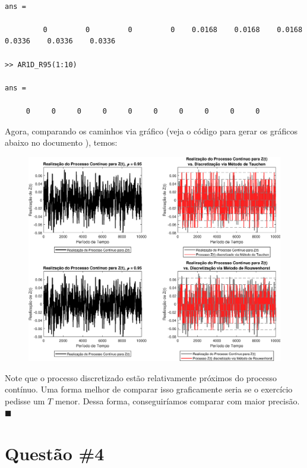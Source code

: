 \documentclass[10pt]{article}
\newcommand*{\QEDA}{\hfill\ensuremath{\blacksquare}}%
\newcommand\0{\mathbf{0}}
\newenvironment{sol}
    {\\[1em] {\color{magenta}\text{Resposta.}}
    }
    {{\color{blue!50!black}\QEDA}}
\begin{document}
\begin{sol}
\begin{lstlisting}
ans =

         0         0         0         0    0.0168    0.0168    0.0168    0.0336    0.0336    0.0336

>> AR1D_R95(1:10)

ans =

     0     0     0     0     0     0     0     0     0     0
\end{lstlisting}
Agora, comparando os caminhos via gráfico (veja o código para gerar os gráficos abaixo no documento ), temos:
\begin{figure}[htp!]
\centering
	\includegraphics[scale=0.63]{myfig.eps}
\end{figure}

Note que o processo discretizado estão relativamente próximos do processo contínuo. Uma forma melhor de comparar isso graficamente seria se o exercício pedisse um $T$ menor. Dessa forma, conseguiríamos comparar com maior precisão.
\end{sol}

\newpage

\section*{Questão \#4}
\end{document}
